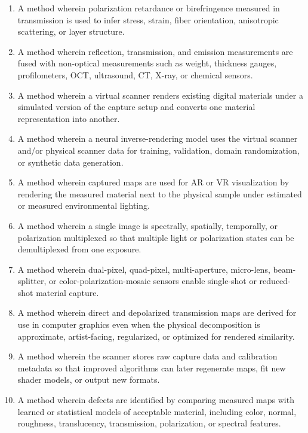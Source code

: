 \documentclass[11pt, twoside, listof=totocnumbered, bibliography=totocnumbered]{scrartcl}
\begin{document}
\begin{enumerate}
		\item A method wherein polarization retardance or birefringence measured in transmission is used to infer stress, strain, fiber orientation, anisotropic scattering, or layer structure.
		
		\item A method wherein reflection, transmission, and emission measurements are fused with non-optical measurements such as weight, thickness gauges, profilometers, OCT, ultrasound, CT, X-ray, or chemical sensors.
		
		\item A method wherein a virtual scanner renders existing digital materials under a simulated version of the capture setup and converts one material representation into another.
		
		\item A method wherein a neural inverse-rendering model uses the virtual scanner and/or physical scanner data for training, validation, domain randomization, or synthetic data generation.
		
		\item A method wherein captured maps are used for AR or VR visualization by rendering the measured material next to the physical sample under estimated or measured environmental lighting.
		
		\item A method wherein a single image is spectrally, spatially, temporally, or polarization multiplexed so that multiple light or polarization states can be demultiplexed from one exposure.
		
		\item A method wherein dual-pixel, quad-pixel, multi-aperture, micro-lens, beam-splitter, or color-polarization-mosaic sensors enable single-shot or reduced-shot material capture.
		
		\item A method wherein direct and depolarized transmission maps are derived for use in computer graphics even when the physical decomposition is approximate, artist-facing, regularized, or optimized for rendered similarity.
		
		\item A method wherein the scanner stores raw capture data and calibration metadata so that improved algorithms can later regenerate maps, fit new shader models, or output new formats.
		
		\item A method wherein defects are identified by comparing measured maps with learned or statistical models of acceptable material, including color, normal, roughness, translucency, transmission, polarization, or spectral features.
		

\end{enumerate}
\end{document}
